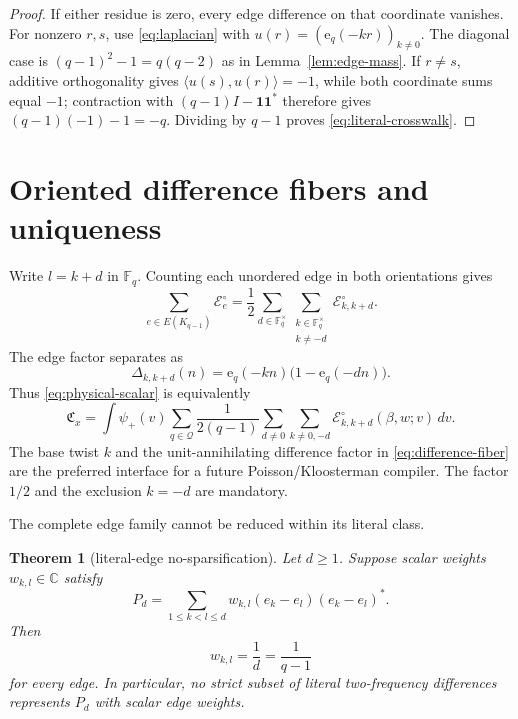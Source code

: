 \documentclass[11pt]{article}
\newtheorem{theorem}{Theorem}[section]
\newcommand{\Fq}{\mathbb F_q}
\newcommand{\C}{\mathbb C}
\newcommand{\e}{\mathrm e}
\newcommand{\one}{\mathbf 1}
\newcommand{\cQ}{\mathcal Q}
\newcommand{\cE}{\mathcal E}
\begin{document}
\begin{proof}
If either residue is zero, every edge difference on that coordinate vanishes.
For nonzero $r,s$, use \eqref{eq:laplacian} with
$u(r)=(\e_q(-kr))_{k\ne0}$.  The diagonal case is
$(q-1)^2-1=q(q-2)$ as in Lemma~\ref{lem:edge-mass}.  If $r\ne s$, additive
orthogonality gives $\langle u(s),u(r)\rangle=-1$, while both coordinate sums
equal $-1$; contraction with $(q-1)I-\one\one^*$ therefore gives
$(q-1)(-1)-1=-q$.  Dividing by $q-1$ proves
\eqref{eq:literal-crosswalk}.
\end{proof}

\section{Oriented difference fibers and uniqueness}
\label{sec:uniqueness}

Write $l=k+d$ in $\Fq$.  Counting each unordered edge in both orientations
gives
\begin{equation}\label{eq:oriented-sum}
 \sum_{e\in E(K_{q-1})}\cE_e^\circ
 =\frac12\sum_{d\in\Fq^\times}
 \sum_{\substack{k\in\Fq^\times\\k\ne-d}}
 \cE_{k,k+d}^\circ.
\end{equation}
The edge factor separates as
\begin{equation}\label{eq:difference-fiber}
 \boxed{
 \Delta_{k,k+d}(n)=\e_q(-kn)\bigl(1-\e_q(-dn)\bigr).}
\end{equation}
Thus \eqref{eq:physical-scalar} is equivalently
\begin{equation}\label{eq:oriented-physical-scalar}
 \mathfrak C_x=
 \int\psi_+(v)\sum_{q\in\cQ}\frac1{2(q-1)}
 \sum_{d\ne0}\sum_{k\ne0,-d}
 \cE_{k,k+d}^\circ(\beta,w;v)\,dv.
\end{equation}
The base twist $k$ and the unit-annihilating difference factor in
\eqref{eq:difference-fiber} are the preferred interface for a future
Poisson/Kloosterman compiler.  The factor $1/2$ and the exclusion
$k=-d$ are mandatory.

The complete edge family cannot be reduced within its literal class.

\begin{theorem}[literal-edge no-sparsification]\label{thm:no-sparsification}
Let $d\ge1$.  Suppose scalar weights $w_{k,l}\in\C$ satisfy
\begin{equation}\label{eq:weighted-edge-decomposition}
 P_d=\sum_{1\le k<l\le d}
 w_{k,l}(e_k-e_l)(e_k-e_l)^*.
\end{equation}
Then
\begin{equation}\label{eq:forced-edge-weight}
 \boxed{w_{k,l}=\frac1d=\frac1{q-1}}
\end{equation}
for every edge.  In particular, no strict subset of literal
two-frequency differences represents $P_d$ with scalar edge weights.
\end{theorem}
\end{document}
